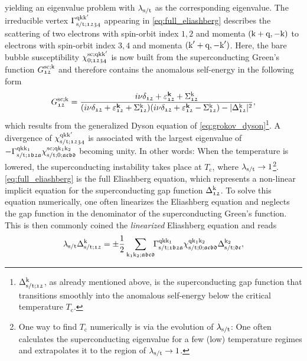 \documentclass[\main/main.tex]{subfiles}
\begin{document}
yielding an eigenvalue problem with $\lambda_{\text{s}/\text{t}}$ as the corresponding eigenvalue. The irreducible vertex $\Gamma^{\text{q}\text{k}\text{k}'}_{\text{s}/\text{t};\mathfrak{1234}}$ appearing in \eqref{eq:full_eliashberg} describes the scattering of two electrons with spin-orbit index $\mathfrak{1},\mathfrak{2}$ and momenta $(\text{k}+\text{q},-\text{k})$ to electrons with spin-orbit index $\mathfrak{3},\mathfrak{4}$ and momenta $(\text{k}'+\text{q},-\text{k}')$. Here, the bare bubble susceptibility $\chi^{\text{sc};\text{q}\text{k}\text{k}'}_{0;\mathfrak{1234}}$ is now built from the superconducting Green's function $G^{\text{sc};\text{k}}_{\mathfrak{12}}$ and therefore contains the anomalous self-energy in the following form
\begin{align}
	G^{\text{sc};\text{k}}_{\mathfrak{12}}=\frac{i\nu\delta_{\mathfrak{12}}+\varepsilon^{\textbf{k}}_{\mathfrak{12}}+\Sigma^{\text{k}}_{\mathfrak{12}}}{(i\nu\delta_{\mathfrak{12}}+\varepsilon^{\textbf{k}}_{\mathfrak{12}}+\Sigma^{\text{k}}_{\mathfrak{12}})(i\nu\delta_{\mathfrak{12}}+\varepsilon^{\textbf{k}}_{\mathfrak{12}}-\Sigma^{\text{k}}_{\mathfrak{12}})-|\Delta_{\mathfrak{12}}^{\text{k}}|^2},
\end{align}
which results from the generalized Dyson equation of \eqref{eq:grokov_dyson}\footnote{$\Delta_{\text{s}/\text{t};\mathfrak{12}}^{\text{k}}$, as already mentioned above, is the superconducting gap function that transitions smoothly into the anomalous self-energy below the critical temperature $T_\mathrm{c}$.}. A divergence of $\chi^{\text{q}\text{k}\text{k}'}_{\text{s}/\text{t};\mathfrak{1234}}$ is associated with the largest eigenvalue of $-\Gamma^{\text{q}\text{k}\text{k}_1}_{\text{s}/\text{t};\mathfrak{1b2a}}\chi^{\text{sc};\text{q}\text{k}_1\text{k}_2}_{\text{s}/\text{t};0;\mathfrak{acbd}}$ becoming unity. In other words: When the temperature is lowered, the superconducting instability takes place at $T_\mathrm{c}$, where $\lambda_{\text{s}/\text{t}}\to 1$\footnote{One way to find $T_\mathrm{c}$ numerically is via the evolution of $\lambda_{\text{s}/\text{t}}$: One often calculates the superconducting eigenvalue for a few (low) temperature regimes and extrapolates it to the region of $\lambda_{\text{s}/\text{t}}\to 1$.}. \eqref{eq:full_eliashberg} is the full Eliashberg equation, which represents a non-linear implicit equation for the superconducting gap function $\Delta_{\mathfrak{12}}^{\text{k}}$. To solve this equation numerically, one often linearizes the Eliashberg equation and neglects the gap function in the denominator of the superconducting Green's function. This is then commonly coined the \textit{linearized} Eliashberg equation and reads
\begin{align}\label{eq:linearized_eliashberg}
	\lambda_{\text{s}/\text{t}}\Delta_{\text{s}/\text{t};\mathfrak{12}}^{\text{k}}=\pm\frac{1}{2}\sum_{\text{k}_1\text{k}_2;\mathfrak{abcd}}\!\!\Gamma^{\text{q}\text{k}\text{k}_1}_{\text{s}/\text{t};\mathfrak{1b2a}}\chi^{\text{q}\text{k}_1\text{k}_2}_{\text{s}/\text{t};0;\mathfrak{acbd}}\Delta_{\text{s}/\text{t};\mathfrak{dc}}^{\text{k}_2},
\end{align}
\end{document}
